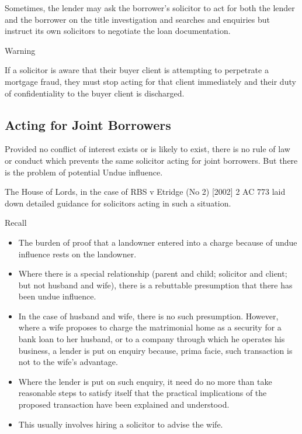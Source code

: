 \documentclass[
]{article}
\providecommand{\tightlist}{%
  \setlength{\itemsep}{0pt}\setlength{\parskip}{0pt}}
\newenvironment{env-7ede146d-a28c-46fa-985d-64c388b7528b}
{
    \savenotes\tcolorbox[blanker,breakable,left=5pt,borderline west={2pt}{-4pt}{orange}]
}
{
    \endtcolorbox\spewnotes
}
\newenvironment{env-d6ce83a0-f7a8-46b6-be95-b1235f1feb63}
{
    \savenotes\tcolorbox[blanker,breakable,left=5pt,borderline west={2pt}{-4pt}{gray}]
}
{
    \endtcolorbox\spewnotes
}
\begin{document}
Sometimes, the lender may ask the borrower's solicitor to act for both
the lender and the borrower on the title investigation and searches and
enquiries but instruct its own solicitors to negotiate the loan
documentation.

\begin{env-7ede146d-a28c-46fa-985d-64c388b7528b}

Warning

If a solicitor is aware that their buyer client is attempting to
perpetrate a mortgage fraud, they must stop acting for that client
immediately and their duty of confidentiality to the buyer client is
discharged.

\end{env-7ede146d-a28c-46fa-985d-64c388b7528b}

\hypertarget{acting-for-joint-borrowers}{%
\subsection{Acting for Joint
Borrowers}\label{acting-for-joint-borrowers}}

Provided no conflict of interest exists or is likely to exist, there is
no rule of law or conduct which prevents the same solicitor acting for
joint borrowers. But there is the problem of potential Undue influence.

The House of Lords, in the case of RBS v Etridge (No 2) {[}2002{]} 2 AC
773 laid down detailed guidance for solicitors acting in such a
situation.

\begin{env-d6ce83a0-f7a8-46b6-be95-b1235f1feb63}

Recall

\begin{itemize}
\tightlist
\item
  The burden of proof that a landowner entered into a charge because of
  undue influence rests on the landowner.
\item
  Where there is a special relationship (parent and child; solicitor and
  client; but not husband and wife), there is a rebuttable presumption
  that there has been undue influence.
\item
  In the case of husband and wife, there is no such presumption.
  However, where a wife proposes to charge the matrimonial home as a
  security for a bank loan to her husband, or to a company through which
  he operates his business, a lender is put on enquiry because, prima
  facie, such transaction is not to the wife's advantage.
\item
  Where the lender is put on such enquiry, it need do no more than take
  reasonable steps to satisfy itself that the practical implications of
  the proposed transaction have been explained and understood.
\item
  This usually involves hiring a solicitor to advise the wife.
\end{itemize}

\end{env-d6ce83a0-f7a8-46b6-be95-b1235f1feb63}
\end{document}
